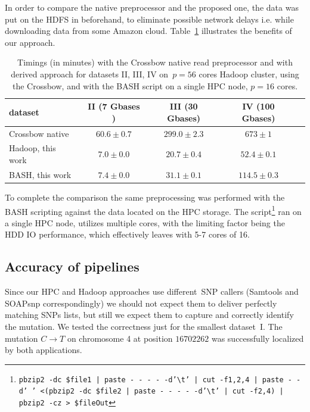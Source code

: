 \documentclass[11pt, oneside]{article}   	%
\begin{document}
In order to compare the native preprocessor and the proposed one, the data was put on the HDFS in beforehand, to eliminate possible network delays i.e. while downloading data from some Amazon cloud.
Table~\ref{table:preprocess} illustrates the benefits of our approach.
\begin{table}[htdp]
\small
\caption{Timings (in minutes) with the  Crossbow native read preprocessor and with derived approach for  datasets II, III, IV  on~$p=56$ cores Hadoop cluster, using the Crossbow, and with the BASH script on a single HPC node, $p=16$ cores.}
\begin{center}
\begin{tabular}{|l|c|c|c|c|}
dataset			&		II (7 Gbases )	& III (30 Gbases)	& IV (100 Gbases)\\
\hline
Crossbow native			&		$60.6\pm0.7$	& $299.0\pm2.3$	&	$673\pm1$	\\
Hadoop, this work			&		$7.0\pm0.0$	&	$20.7\pm0.4$&		$52.4\pm0.1$\\
BASH, this work			& 		$7.4\pm0.0$	&	$31.1\pm0.1$	&	$114.5\pm0.3$	\\
\end{tabular}
\end{center}
\label{table:preprocess}
\normalsize
\end{table}%
To complete the comparison the same preprocessing was performed with the  BASH scripting against the data located on the HPC storage. The script\footnote{\texttt {pbzip2 -dc  \${file1} | paste - - - - -d'\textbackslash t' | cut -f1,2,4 | paste - -d' ' <(pbzip2 -dc  \${file2} | paste - - - - -d'\textbackslash t' | cut -f2,4) | pbzip2 -cz > \${fileOut}}} ran on a single HPC node, utilizes  multiple cores, with the limiting factor being the  HDD IO performance, which effectively leaves with 5-7 cores of 16.



\subsection{Accuracy of pipelines}
Since our HPC and Hadoop approaches use different~SNP callers (Samtools and SOAPsnp correspondingly) we should not expect them to deliver perfectly matching SNPs lists, but still we expect them to capture and correctly identify the mutation. We tested the correctness just for the smallest dataset~I. The mutation $C\rightarrow T$ on chromosome 4 at position $16702262$\cite{schneeberger} was successfully localized by both applications.
\end{document}
